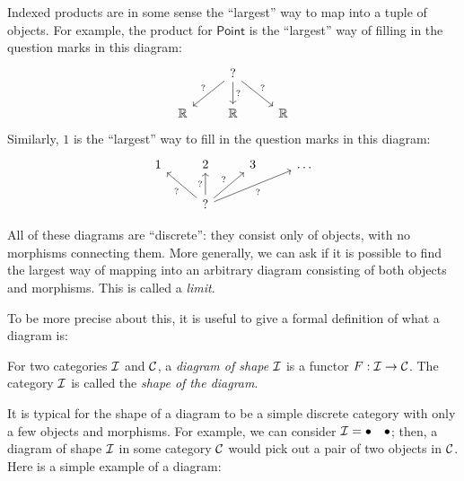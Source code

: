 Indexed products are in some sense the ``largest'' way to map
into a tuple of objects.
For example, the product for \(\mathsf{Point}\)
is the ``largest'' way of filling in the question marks in this diagram:
\[%
\begin{tikzcd}
   & ? \arrow[ld, "?"'] \arrow[d, "?"] \arrow[rd, "?"] &    \\
\R & \R                                                & \R
\end{tikzcd}\]
Similarly, \(1\) is the ``largest'' way to fill in
the question marks in this diagram:
\[%
\begin{tikzcd}
1 & 2                                                                  & 3 & \dots \\
  & ? \arrow[lu, "?"] \arrow[u, "?"] \arrow[ru, "?"] \arrow[rru, "?"'] &   &
\end{tikzcd}\]

All of these diagrams are ``discrete'': they consist only of objects,
with no morphisms connecting them.
More generally, we can ask if it is possible to find the largest
way of mapping into an arbitrary diagram consisting of both objects and morphisms.
This is called a \emph{limit}.

To be more precise about this, it is useful to give a formal definition of 
what a diagram is:
\begin{definition}[Diagram]
  \sloppy
  For two categories $\mathcal I$ and $\mathcal C$, a
  \emph{diagram of shape $\mathcal I$} is a functor $F : \mathcal I \to \mathcal C$.
  The category $\mathcal I$ is called the \emph{shape of the diagram}.
\end{definition}

It is typical for the shape of a diagram to be a simple discrete category with
only a few objects and morphisms.  For example, we can consider $\mathcal I = \bullet
\quad \bullet$; then, a diagram of shape $\mathcal I$ in some category $\mathcal C$ would
pick out a pair of two objects in $\mathcal C$. Here is a simple example of a
diagram:

